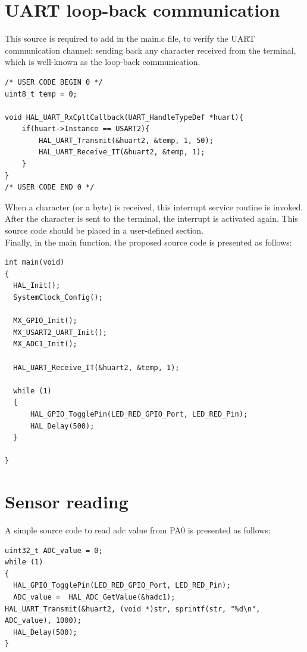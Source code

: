\documentclass[twoside, final]{hcmut_report}
\begin{document}
\section{UART loop-back communication}
This source is required to add in the main.c file, to verify the UART communication channel: sending back any character received from the terminal, which is well-known as the loop-back communication.

\begin{lstlisting}[caption= Implement the UART interrupt service routine]
/* USER CODE BEGIN 0 */
uint8_t temp = 0;

void HAL_UART_RxCpltCallback(UART_HandleTypeDef *huart){
	if(huart->Instance == USART2){
		HAL_UART_Transmit(&huart2, &temp, 1, 50);
		HAL_UART_Receive_IT(&huart2, &temp, 1);
	}
}
/* USER CODE END 0 */
\end{lstlisting}

When a character (or a byte) is received, this interrupt service routine is invoked. After the character is sent to the terminal, the interrupt is activated again. This source code should be placed in a user-defined section.\\

Finally, in the main function, the proposed source code is presented as follows:

\begin{lstlisting}[caption=Implement the main function]
int main(void)
{
  HAL_Init();
  SystemClock_Config();

  MX_GPIO_Init();
  MX_USART2_UART_Init();
  MX_ADC1_Init();

  HAL_UART_Receive_IT(&huart2, &temp, 1);

  while (1)
  {
	  HAL_GPIO_TogglePin(LED_RED_GPIO_Port, LED_RED_Pin);
	  HAL_Delay(500);
  }
  
}
\end{lstlisting}

\section{Sensor reading}
A simple source code to read adc value from PA0 is presented as follows:
\begin{lstlisting}[caption=ADC reading from AN0]
uint32_t ADC_value = 0;
while (1)
{
  HAL_GPIO_TogglePin(LED_RED_GPIO_Port, LED_RED_Pin);
  ADC_value =  HAL_ADC_GetValue(&hadc1);
HAL_UART_Transmit(&huart2, (void *)str, sprintf(str, "%d\n", ADC_value), 1000);
  HAL_Delay(500);
}
\end{lstlisting}
\end{document}
